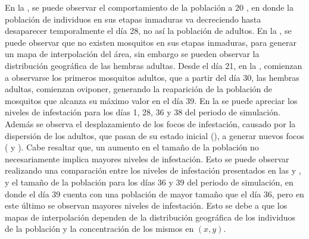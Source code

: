 En la , se puede observar el comportamiento de la población a
20 \textcelsius, en donde la población de individuos en sus etapas inmaduras va decreciendo hasta
desaparecer temporalmente el día 28, no así la población de adultos. En la
, se puede observar que no existen mosquitos en sus etapas
inmaduras, para generar un mapa de interpolación del área, sin embargo se pueden observar la
distribución geográfica de las hembras adultas. Desde el día 21, en la
, comienzan a observarse los primeros mosquitos adultos, que a
partir del día 30, las hembras adultas, comienzan oviponer, generando la reaparición de la
población de mosquitos que alcanza su máximo valor en el día 39. En la
 se puede apreciar los niveles de infestación para los
días 1, 28, 36 y 38 del periodo de simulación. Además se observa el desplazamiento de los focos de
infestación, causado por la dispersión de los adultos, que pasan de su estado inicial
(), a generar nuevos focos
( y ). Cabe resaltar
que, un aumento en el tamaño de la población no necesariamente implica mayores niveles de
infestación. Esto se puede observar realizando una comparación entre los niveles de infestación
presentados en las  y ,
y el tamaño de la población para los días 36 y 39 del periodo de simulación, en donde el día 39
cuenta con una población de mayor tamaño que el día 36, pero en este último se observan mayores
niveles de infestación. Esto se debe a que los mapas de interpolación dependen de la distribución
geográfica de los individuos de la población y la concentración de los mismos en $(x,y)$.

